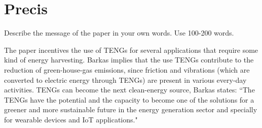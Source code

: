 \documentclass{article}
\begin{document}
\clearpage
\section{Precis}
Describe the message of the paper in your own words. Use 100-200
words.
\begin{mdframed}
The paper incentives the use of TENGs for several applications that require some kind of energy harvesting. Barkas implies that the use TENGs contribute to the reduction of green-house-gas emissions, since friction and vibrations (which are converted to electric energy through TENGs) are present in various every-day activities. TENGs can become the next clean-energy source, Barkas states: ``The TENGs have the potential and the capacity to become one of the solutions for a greener and more sustainable future in the energy generation sector and specially for wearable devices and IoT applications."
\end{mdframed}

\clearpage
\printbibliography

%
\end{document}
